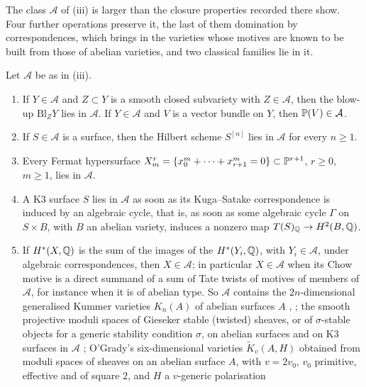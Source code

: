 The class $\mathcal{A}$ of (iii) is larger than the
closure properties recorded there show. Four further operations
preserve it, the last of them domination by correspondences, which brings in
the varieties whose motives are known to be built from those of abelian
varieties, and two classical families lie in it.

\begin{proposition}\label{prop:aclosure}
Let $\mathcal{A}$ be as in (iii).
\begin{enumerate}[label=\textup{(\roman*)},leftmargin=2.6em,itemsep=2pt]
\item If $Y\in\mathcal{A}$ and $Z\subset Y$ is a smooth closed subvariety
  with $Z\in\mathcal{A}$, then the blow-up $\mathrm{Bl}_{Z}Y$ lies in
  $\mathcal{A}$. If $Y\in\mathcal{A}$ and $V$ is a vector bundle on $Y$,
  then $\mathbb{P}(V)\in\mathcal{A}$.
\item If $S\in\mathcal{A}$ is a surface, then the Hilbert scheme $S^{[n]}$
  lies in $\mathcal{A}$ for every $n\ge1$.
\item Every Fermat hypersurface
  $X^{r}_{m}=\{x_{0}^{m}+\dots+x_{r+1}^{m}=0\}\subset\mathbb{P}^{r+1}$, $r\ge0$,
  $m\ge1$, lies in $\mathcal{A}$.
\item A K3 surface $S$ lies in $\mathcal{A}$ as soon as its Kuga--Satake
  correspondence is induced by an algebraic cycle, that is, as soon as some
  algebraic cycle $\Gamma$ on $S\times B$, with $B$ an abelian variety,
  induces a nonzero map $T(S)_{\mathbb{Q}}\to H^{2}(B,\mathbb{Q})$.
\item If $H^{*}(X,\mathbb{Q})$ is the sum of the images of the $H^{*}(Y_{i},\mathbb{Q})$,
  with $Y_{i}\in\mathcal{A}$, under algebraic correspondences, then
  $X\in\mathcal{A}$; in particular $X\in\mathcal{A}$ when its Chow motive is
  a direct summand of a sum of Tate twists of motives of members of
  $\mathcal{A}$, for instance when it is of abelian type. So $\mathcal{A}$
  contains the $2n$-dimensional generalised Kummer varieties $K_{n}(A)$ of
  abelian surfaces $A$ \cite[Theorem~2.7, Corollary~2.8]{Xu15},
  \cite[Theorem~1.5]{FTV19}; the smooth projective moduli spaces of Gieseker
  stable (twisted) sheaves, or of $\sigma$-stable objects for a generic
  stability condition $\sigma$, on abelian surfaces and on K3 surfaces in
  $\mathcal{A}$ \cite[Theorem~0.1, Remark~2.1]{Bue20}; O'Grady's
  six-dimensional varieties $\widetilde K_{v}(A,H)$ obtained from moduli
  spaces of sheaves on an abelian surface $A$, with $v=2v_{0}$, $v_{0}$
  primitive, effective and of square $2$, and $H$ a $v$-generic polarisation

\end{enumerate}
\end{proposition}
